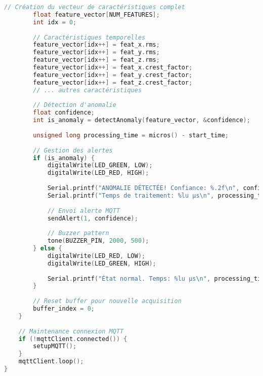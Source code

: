 \begin{lstlisting}[language=C, caption=Boucle principale du système]
        // Création du vecteur de caractéristiques complet
        float feature_vector[NUM_FEATURES];
        int idx = 0;
        
        // Caractéristiques temporelles
        feature_vector[idx++] = feat_x.rms;
        feature_vector[idx++] = feat_y.rms;
        feature_vector[idx++] = feat_z.rms;
        feature_vector[idx++] = feat_x.crest_factor;
        feature_vector[idx++] = feat_y.crest_factor;
        feature_vector[idx++] = feat_z.crest_factor;
        // ... autres caractéristiques
        
        // Détection d'anomalie
        float confidence;
        int is_anomaly = detectAnomaly(feature_vector, &confidence);
        
        unsigned long processing_time = micros() - start_time;
        
        // Gestion des alertes
        if (is_anomaly) {
            digitalWrite(LED_GREEN, LOW);
            digitalWrite(LED_RED, HIGH);
            
            Serial.printf("ANOMALIE DÉTECTÉE! Confiance: %.2f\n", confidence);
            Serial.printf("Temps de traitement: %lu µs\n", processing_time);
            
            // Envoi alerte MQTT
            sendAlert(1, confidence);
            
            // Buzzer pattern
            tone(BUZZER_PIN, 2000, 500);
        } else {
            digitalWrite(LED_RED, LOW);
            digitalWrite(LED_GREEN, HIGH);
            
            Serial.printf("État normal. Temps: %lu µs\n", processing_time);
        }
        
        // Reset buffer pour nouvelle acquisition
        buffer_index = 0;
    }
    
    // Maintenance connexion MQTT
    if (!mqttClient.connected()) {
        setupMQTT();
    }
    mqttClient.loop();
}
\end{lstlisting}